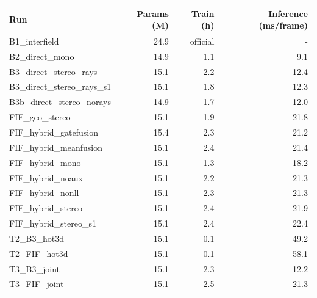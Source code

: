 \begin{tabular}{lrrr}
\toprule
Run & Params (M) & Train (h) & Inference (ms/frame) \\
\midrule
B1\_interfield & 24.9 & official & - \\
B2\_direct\_mono & 14.9 & 1.1 & 9.1 \\
B3\_direct\_stereo\_rays & 15.1 & 2.2 & 12.4 \\
B3\_direct\_stereo\_rays\_s1 & 15.1 & 1.8 & 12.3 \\
B3b\_direct\_stereo\_norays & 14.9 & 1.7 & 12.0 \\
FIF\_geo\_stereo & 15.1 & 1.9 & 21.8 \\
FIF\_hybrid\_gatefusion & 15.4 & 2.3 & 21.2 \\
FIF\_hybrid\_meanfusion & 15.1 & 2.4 & 21.4 \\
FIF\_hybrid\_mono & 15.1 & 1.3 & 18.2 \\
FIF\_hybrid\_noaux & 15.1 & 2.2 & 21.3 \\
FIF\_hybrid\_nonll & 15.1 & 2.3 & 21.3 \\
FIF\_hybrid\_stereo & 15.1 & 2.4 & 21.9 \\
FIF\_hybrid\_stereo\_s1 & 15.1 & 2.4 & 22.4 \\
T2\_B3\_hot3d & 15.1 & 0.1 & 49.2 \\
T2\_FIF\_hot3d & 15.1 & 0.1 & 58.1 \\
T3\_B3\_joint & 15.1 & 2.3 & 12.2 \\
T3\_FIF\_joint & 15.1 & 2.5 & 21.3 \\
\bottomrule
\end{tabular}
